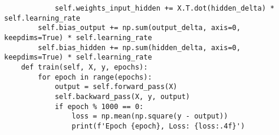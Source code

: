 \documentclass[10pt]{article}
\begin{document}
\begin{multicols*}{3}
\begin{lstlisting}
            self.weights_input_hidden += X.T.dot(hidden_delta) * self.learning_rate
        self.bias_output += np.sum(output_delta, axis=0, keepdims=True) * self.learning_rate
        self.bias_hidden += np.sum(hidden_delta, axis=0, keepdims=True) * self.learning_rate
    def train(self, X, y, epochs):
        for epoch in range(epochs):
            output = self.forward_pass(X)
            self.backward_pass(X, y, output)
            if epoch % 1000 == 0:
                loss = np.mean(np.square(y - output))
                print(f'Epoch {epoch}, Loss: {loss:.4f}')
\end{lstlisting}




\end{multicols*}
\end{document}
